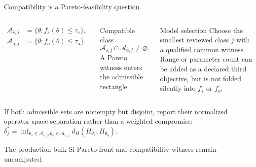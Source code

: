 \documentclass[aspectratio=169,10pt]{beamer}
\newcommand{\future}[1]{\textcolor{prospectivered}{#1}}
\begin{document}
\begin{frame}{Compatibility is a Pareto-feasibility question}
  \small
  \begin{columns}[T]
      \centering
      \scriptsize
      \begin{align*}
        \mathcal A_{s,j}&=\{\theta:f_s(\theta)\le\tau_s\},\\
        \mathcal A_{o,j}&=\{\theta:f_o(\theta)\le\tau_o\}.
      \end{align*}
      \begin{block}{Compatible class}
        \[
          \mathcal A_{s,j}\cap\mathcal A_{o,j}\neq\varnothing.
        \]
        A Pareto witness enters the admissible rectangle.
      \end{block}
      \begin{block}{Model selection}
        Choose the smallest reviewed class $j$ with a qualified common witness. Range or
        parameter count can be added as a declared third objective, but is not folded
        silently into $f_s$ or $f_o$.
      \end{block}
  \end{columns}

  \vspace{0.25em}
  \scriptsize
  If both admissible sets are nonempty but disjoint, report their normalized
  operator-space separation rather than a weighted compromise:
  $\delta_j^*=\inf_{\theta_s\in\mathcal A_{s,j},\theta_o\in\mathcal A_{o,j}}
  d_H(H_{\theta_s},H_{\theta_o})$.

  \future{The production bulk-Si Pareto front and compatibility witness remain
  uncomputed.}
\end{frame}
\end{document}
